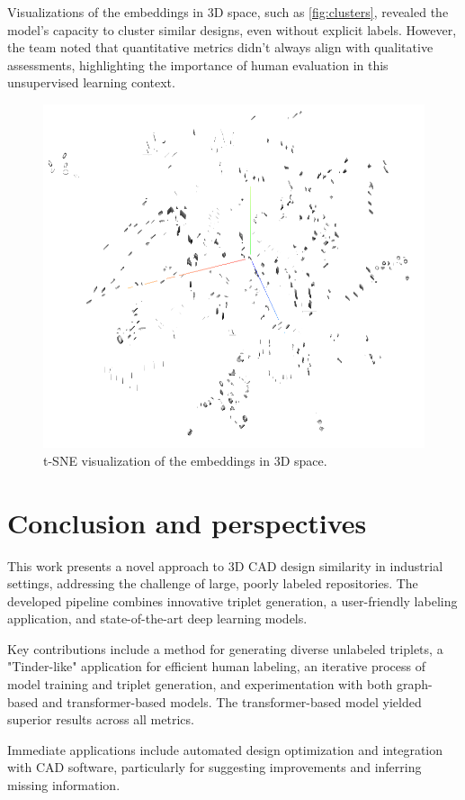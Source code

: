 \documentclass{article}
\begin{document}
Visualizations of the embeddings in 3D space, such as \autoref{fig:clusters}, revealed the model's capacity to cluster similar designs, even without explicit labels. However, the team noted that quantitative metrics didn't always align with qualitative assessments, highlighting the importance of human evaluation in this unsupervised learning context.

\begin{figure}[h]
    \centering
    \includegraphics[width=0.7\columnwidth]{assets/clusters_tsne.png}
    \caption{t-SNE visualization of the embeddings in 3D space.}
    \label{fig:clusters}
\end{figure}

\section{Conclusion and perspectives}

This work presents a novel approach to 3D CAD design similarity in industrial settings, addressing the challenge of large, poorly labeled repositories. The developed pipeline combines innovative triplet generation, a user-friendly labeling application, and state-of-the-art deep learning models. 

Key contributions include a method for generating diverse unlabeled triplets, a "Tinder-like" application for efficient human labeling, an iterative process of model training and triplet generation, and experimentation with both graph-based and transformer-based models. The transformer-based model yielded superior results across all metrics. 

Immediate applications include automated design optimization and integration with CAD software, particularly for suggesting improvements and inferring missing information.
\end{document}
